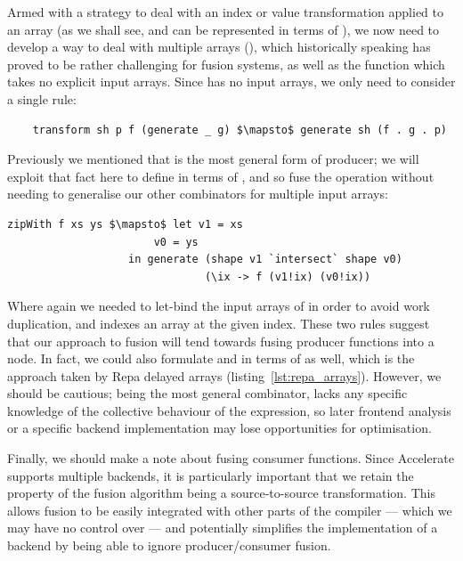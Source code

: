 Armed with a strategy to deal with an index or value transformation applied to
an array (as we shall see,  and  can be
represented in terms of ), we now need to develop a way to
deal with multiple arrays (), which historically speaking has
proved to be rather challenging for fusion systems, as well as the
 function which takes no explicit input arrays. Since
 has no input arrays, we only need to consider a single rule:
%
\begin{lstlisting}[style=haskell,numbers=none,mathescape]
%\bf$\langle$ RULE: generate/transform $\rangle$%
    transform sh p f (generate _ g) $\mapsto$ generate sh (f . g . p)
\end{lstlisting}
%
Previously we mentioned that  is the most general form of
producer; we will exploit that fact here to define  in
terms of , and so fuse the operation without needing to
generalise our other combinators for multiple input arrays:
%
\begin{lstlisting}[style=haskell,numbers=none,mathescape]
zipWith f xs ys $\mapsto$ let v1 = xs
                       v0 = ys
                   in generate (shape v1 `intersect` shape v0)
                               (\ix -> f (v1!ix) (v0!ix))
\end{lstlisting}
%
Where again we needed to let-bind the input arrays of 
in order to avoid work duplication, and \code{(!)} indexes an array at the
given index. These two rules suggest that our approach to fusion will tend
towards fusing producer functions into a  node. In fact, we
could also formulate  and  in terms of
 as well, which is the approach taken by Repa delayed arrays
(listing~\ref{lst:repa_arrays}). However, we should be cautious; being the most
general combinator,  lacks any specific knowledge of the
collective behaviour of the expression, so later frontend analysis or a specific
backend implementation may lose opportunities for optimisation.

Finally, we should make a note about fusing consumer functions. Since Accelerate
supports multiple backends, it is particularly important that we retain the
property of the fusion algorithm being a source-to-source transformation. This
allows fusion to be easily integrated with other parts of the compiler --- which
we may have no control over --- and potentially simplifies the implementation of
a backend by being able to ignore producer/consumer fusion.


